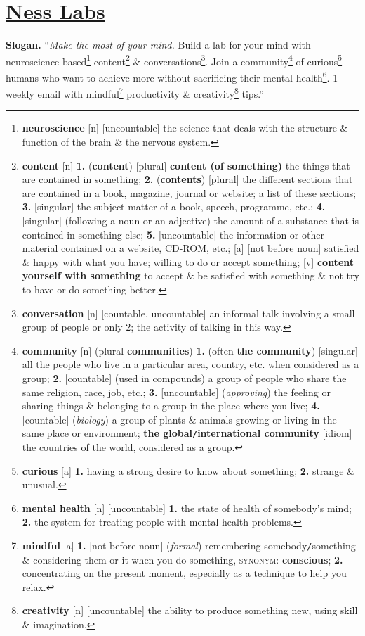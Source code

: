 \documentclass[oneside]{book}
\numberwithin{equation}{section}
\begin{document}
\section{\href{https://nesslabs.com/}{Ness Labs}}
\textbf{Slogan.} ``\textit{Make the most of your mind.} Build a lab for your mind with neuroscience-based\footnote{\textbf{neuroscience} [n] [uncountable] the science that deals with the structure \& function of the brain \& the nervous system.} content\footnote{\textbf{content} [n] \textbf{1.} (\textbf{content}) [plural] \textbf{content (of something)} the things that are contained in something; \textbf{2.} (\textbf{contents}) [plural] the different sections that are contained in a book, magazine, journal or website; a list of these sections; \textbf{3.} [singular] the subject matter of a book, speech, programme, etc.; \textbf{4.} [singular] (following a noun or an adjective) the amount of a substance that is contained in something else; \textbf{5.} [uncountable] the information or other material contained on a website, CD-ROM, etc.; [a] [not before noun] satisfied \& happy with what you have; willing to do or accept something; [v] \textbf{content yourself with something} to accept \& be satisfied with something \& not try to have or do something better.} \& conversations\footnote{\textbf{conversation} [n] [countable, uncountable] an informal talk involving a small group of people or only 2; the activity of talking in this way.}. Join a community\footnote{\textbf{community} [n] (plural \textbf{communities}) \textbf{1.} (often \textbf{the community}) [singular] all the people who live in a particular area, country, etc. when considered as a group; \textbf{2.} [countable] (used in compounds) a group of people who share the same religion, race, job, etc.; \textbf{3.} [uncountable] (\textit{approving}) the feeling or sharing things \& belonging to a group in the place where you live; \textbf{4.} [countable] (\textit{biology}) a group of plants \& animals growing or living in the same place or environment; \textbf{the global\texttt{/}international community} [idiom] the countries of the world, considered as a group.} of curious\footnote{\textbf{curious} [a] \textbf{1.} having a strong desire to know about something; \textbf{2.} strange \& unusual.} humans who want to achieve more without sacrificing their mental health\footnote{\textbf{mental health} [n] [uncountable] \textbf{1.} the state of health of somebody's mind; \textbf{2.} the system for treating people with mental health problems.}. 1 weekly email with mindful\footnote{\textbf{mindful} [a] \textbf{1.} [not before noun] (\textit{formal}) remembering somebody\texttt{/}something \& considering them or it when you do something, \textsc{synonym}: \textbf{conscious}; \textbf{2.} concentrating on the present moment, especially as a technique to help you relax.} productivity \& creativity\footnote{\textbf{creativity} [n] [uncountable] the ability to produce something new, using skill \& imagination.} tips.''
\end{document}
